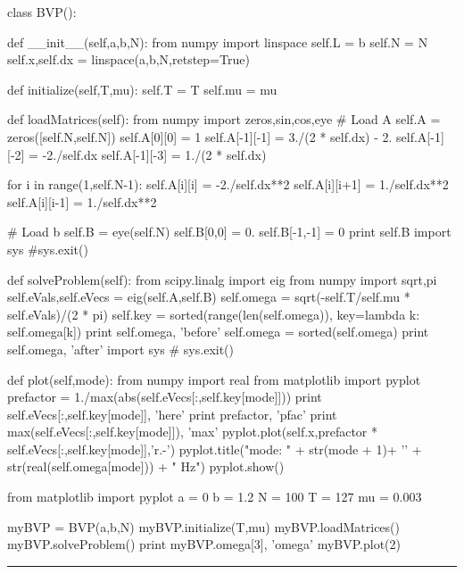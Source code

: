 \begin{codeexample}
\begin{VerbatimOut}{\listingFile}
class BVP():

    def __init__(self,a,b,N):
        from numpy import linspace
        self.L = b
        self.N = N
        self.x,self.dx = linspace(a,b,N,retstep=True)

    def initialize(self,T,mu):
        self.T = T
        self.mu = mu

    def loadMatrices(self):
        from numpy import zeros,sin,cos,eye
        # Load A
        self.A = zeros([self.N,self.N])
        self.A[0][0] = 1
        self.A[-1][-1] = 3./(2 * self.dx) - 2.
        self.A[-1][-2] = -2./self.dx
        self.A[-1][-3] = 1./(2 * self.dx)

        for i in range(1,self.N-1):
            self.A[i][i] = -2./self.dx**2
            self.A[i][i+1] = 1./self.dx**2
            self.A[i][i-1] = 1./self.dx**2

        # Load b
        self.B = eye(self.N)
        self.B[0,0] = 0.
        self.B[-1,-1] = 0
        print self.B
        import sys
        #sys.exit()

    def solveProblem(self):
        from scipy.linalg import eig
        from numpy import sqrt,pi
        self.eVals,self.eVecs = eig(self.A,self.B)
        self.omega = sqrt(-self.T/self.mu * self.eVals)/(2 * pi)
        self.key = sorted(range(len(self.omega)), key=lambda k: self.omega[k])
        print self.omega, 'before'
        self.omega = sorted(self.omega)
        print self.omega, 'after'
        import sys
        # sys.exit()
        
    def plot(self,mode):
        from numpy import real
        from matplotlib import pyplot
        prefactor = 1./max(abs(self.eVecs[:,self.key[mode]]))
        print self.eVecs[:,self.key[mode]], 'here'
        print prefactor, 'pfac'
        print max(self.eVecs[:,self.key[mode]]), 'max'
        pyplot.plot(self.x,prefactor * self.eVecs[:,self.key[mode]],'r.-')
        pyplot.title("mode:  " + str(mode + 1)+ '\n' +  str(real(self.omega[mode])) + " Hz")
        pyplot.show()

    
from matplotlib import pyplot
a = 0
b = 1.2
N = 100
T  = 127
mu = 0.003

myBVP = BVP(a,b,N)
myBVP.initialize(T,mu)
myBVP.loadMatrices()
myBVP.solveProblem()
print myBVP.omega[3], 'omega'
myBVP.plot(2)
\end{VerbatimOut}
\end{codeexample}
\else
\noindent\rule{5 in}{0.01 in}
\fi
